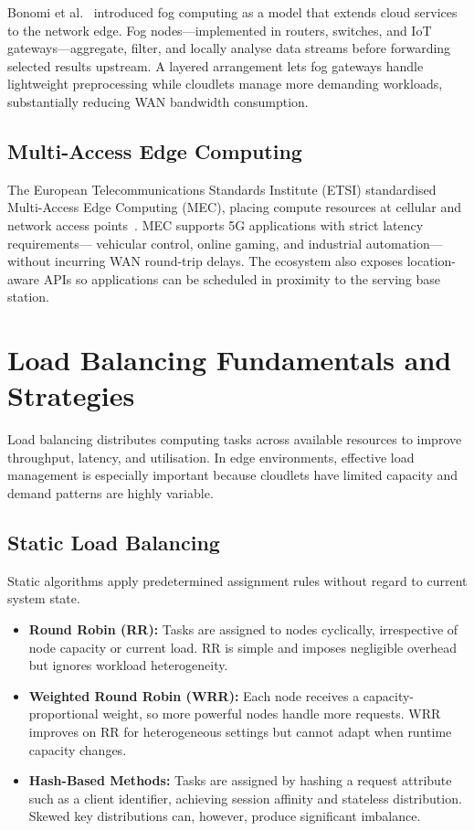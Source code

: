 Bonomi et al.~\cite{bonomi2012fog} introduced fog computing as a
model that extends cloud services to the network edge. Fog
nodes---implemented in routers, switches, and IoT gateways---aggregate,
filter, and locally analyse data streams before forwarding selected
results upstream. A layered arrangement lets fog gateways handle
lightweight preprocessing while cloudlets manage more demanding
workloads, substantially reducing WAN bandwidth consumption.

\subsection{Multi-Access Edge Computing}

The European Telecommunications Standards Institute (ETSI)
standardised Multi-Access Edge Computing (MEC), placing compute
resources at cellular and network access points~\cite{etsi2016mec}.
MEC supports 5G applications with strict latency requirements---
vehicular control, online gaming, and industrial automation---without
incurring WAN round-trip delays. The ecosystem also exposes
location-aware APIs so applications can be scheduled in proximity
to the serving base station.

\section{Load Balancing Fundamentals and Strategies}
\label{sec:lit_lb}

Load balancing distributes computing tasks across available
resources to improve throughput, latency, and utilisation. In
edge environments, effective load management is especially
important because cloudlets have limited capacity and demand
patterns are highly variable.

\subsection{Static Load Balancing}

Static algorithms apply predetermined assignment rules without
regard to current system state.

\begin{itemize}
  \item \textbf{Round Robin (RR):} Tasks are assigned to nodes
  cyclically, irrespective of node capacity or current load. RR
  is simple and imposes negligible overhead but ignores workload
  heterogeneity.

  \item \textbf{Weighted Round Robin (WRR):} Each node receives a
  capacity-proportional weight, so more powerful nodes handle more
  requests. WRR improves on RR for heterogeneous settings but
  cannot adapt when runtime capacity changes.

  \item \textbf{Hash-Based Methods:} Tasks are assigned by hashing
  a request attribute such as a client identifier, achieving
  session affinity and stateless distribution. Skewed key
  distributions can, however, produce significant imbalance.
\end{itemize}

